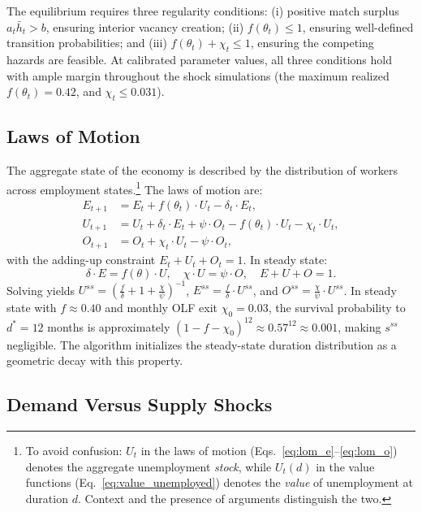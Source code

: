 \documentclass[12pt]{article}
\begin{document}
The equilibrium requires three regularity conditions: (i) positive match surplus $a_t \bar{h}_t > b$, ensuring interior vacancy creation; (ii) $f(\theta_t) \leq 1$, ensuring well-defined transition probabilities; and (iii) $f(\theta_t) + \chi_t \leq 1$, ensuring the competing hazards are feasible. At calibrated parameter values, all three conditions hold with ample margin throughout the shock simulations (the maximum realized $f(\theta_t) = 0.42$, and $\chi_t \leq 0.031$).

\subsection{Laws of Motion}

The aggregate state of the economy is described by the distribution of workers across employment states.\footnote{To avoid confusion: $U_t$ in the laws of motion (Eqs.~\ref{eq:lom_e}--\ref{eq:lom_o}) denotes the aggregate unemployment \textit{stock}, while $U_t(d)$ in the value functions (Eq.~\ref{eq:value_unemployed}) denotes the \textit{value} of unemployment at duration $d$. Context and the presence of arguments distinguish the two.} The laws of motion are:
\begin{align}
E_{t+1} &= E_t + f(\theta_t) \cdot U_t - \delta_t \cdot E_t, \label{eq:lom_e} \\
U_{t+1} &= U_t + \delta_t \cdot E_t + \psi \cdot O_t - f(\theta_t) \cdot U_t - \chi_t \cdot U_t, \label{eq:lom_u} \\
O_{t+1} &= O_t + \chi_t \cdot U_t - \psi \cdot O_t, \label{eq:lom_o}
\end{align}
with the adding-up constraint $E_t + U_t + O_t = 1$. In steady state:
\begin{equation}
\delta \cdot E = f(\theta) \cdot U, \quad \chi \cdot U = \psi \cdot O, \quad E + U + O = 1.
\label{eq:steadystate}
\end{equation}
Solving yields $U^{ss} = \left( \frac{f}{\delta} + 1 + \frac{\chi}{\psi} \right)^{-1}$, $E^{ss} = \frac{f}{\delta} \cdot U^{ss}$, and $O^{ss} = \frac{\chi}{\psi} \cdot U^{ss}$. In steady state with $f \approx 0.40$ and monthly OLF exit $\chi_0 = 0.03$, the survival probability to $d^* = 12$ months is approximately $(1 - f - \chi_0)^{12} \approx 0.57^{12} \approx 0.001$, making $s^{ss}$ negligible. The algorithm initializes the steady-state duration distribution as a geometric decay with this property.

\subsection{Demand Versus Supply Shocks}
\end{document}
